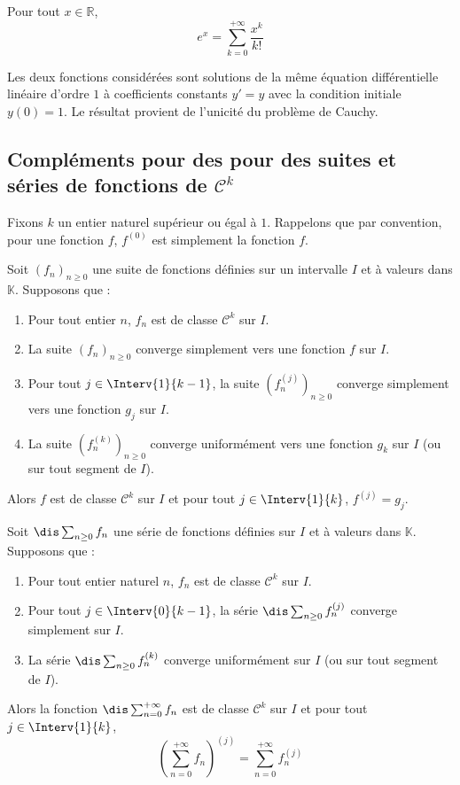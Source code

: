 \documentclass[a4paper,10pt]{report}
\begin{document}
\vspace{9cm}

\begin{cor} Pour tout $x \in \mathbb{R}$, 
$$ e^x = \sum_{k=0}^{+ \infty} \frac{x^k}{k!}$$
\end{cor}

\begin{preuve} Les deux fonctions considérées sont solutions de la même équation différentielle linéaire d'ordre $1$ à coefficients constants $y'=y$ avec la condition initiale $y(0)=1$. Le résultat provient de l'unicité du problème de Cauchy.
\end{preuve}

\subsection{Compléments pour des pour des suites et séries de fonctions de $\mathcal{C}^k$}

\noindent Fixons $k$ un entier naturel supérieur ou égal à $1$. Rappelons que par convention, pour une fonction $f$, $f^{(0)}$ est simplement la fonction $f$.

\medskip

\begin{thm} Soit $(f_n)_{n \geq 0}$ une suite de fonctions définies sur un intervalle $I$ et à valeurs dans $\mathbb{K}$. Supposons que :

\begin{enumerate}
\item Pour tout entier $n$, $f_n$ est de classe $\mathcal{C}^k$ sur $I$.
\item La suite $(f_n)_{n \geq 0}$ converge simplement vers une fonction $f$ sur $I$.
\item Pour tout $j \in \Interv{1}{k-1}$, la suite $(f_n^{(j)})_{n \geq 0}$ converge simplement vers une fonction $g_j$ sur $I$.
\item La suite $(f_n^{(k)})_{n \geq 0}$ converge uniformément vers une fonction $g_k$ sur $I$ (ou sur tout segment de $I$).
\end{enumerate}
Alors $f$ est de classe $\mathcal{C}^k$ sur $I$ et pour tout $j \in \Interv{1}{k}$, $f^{(j)} = g_j$.
\end{thm}

\begin{thm}
Soit $\dis \sum_{n \geq 0} f_n$ une série de fonctions définies sur $I$ et à valeurs dans $\mathbb{K}$. Supposons que :

\begin{enumerate}
\item Pour tout entier naturel $n$, $f_n$ est de classe $\mathcal{C}^k$ sur $I$.
\item Pour tout $j \in \Interv{0}{k-1}$, la série $\dis \sum_{n \geq 0} f_n^{(j)}$ converge simplement sur $I$.
\item La série $\dis \sum_{n \geq 0} f_n^{(k)}$ converge uniformément sur $I$ (ou sur tout segment de $I$).
\end{enumerate}
Alors la fonction $\dis \sum_{n=0}^{+ \infty} f_n$ est de classe $\mathcal{C}^k$ sur $I$ et pour tout $j \in \Interv{1}{k}$,
$$ \left( \sum_{n=0}^{+ \infty} f_n \right)^{(j)} = \sum_{n=0}^{+ \infty} f_n^{(j)}$$
\end{thm}
\end{document}
